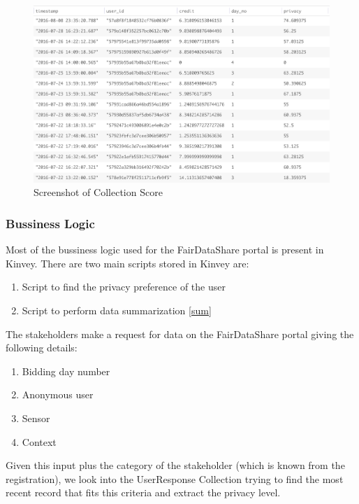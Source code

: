 \begin{figure}[ht!]
\centering
\includegraphics[width=\textwidth,keepaspectratio,height=0.6\textwidth]{./images/collection_score}
\caption{Screenshot of Collection Score}
\label{fig:col_score}
\end{figure}


\subsubsection{Bussiness Logic} \label{bl}
Most of the bussiness logic used for the FairDataShare portal is present in Kinvey. There are two main scripts stored in Kinvey are:

\begin{enumerate}
    \item Script to find the privacy preference of the user
    \item Script to perform data summarization \ref{sum}
\end{enumerate}

The stakeholders make a request for data on the FairDataShare portal giving the following details:

\begin{enumerate}
    \item Bidding day number
    \item Anonymous user
    \item Sensor
    \item Context
\end{enumerate}

Given this input plus the category of the stakeholder (which is known from the registration), we look into the UserResponse Collection trying to find the most recent record that
fits this criteria and extract the privacy level.

